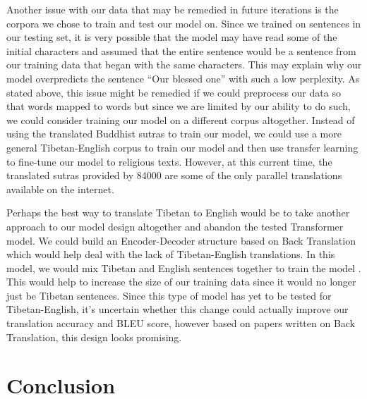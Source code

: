 \documentclass[letterpaper, 12 pt, conference]{ieeeconf}  %
\begin{document}
Another issue with our data that may be remedied in future iterations is the corpora we chose to train and test our model on. Since we trained on sentences in our testing set, it is very possible that the model may have read some of the initial characters and assumed that the entire sentence would be a sentence from our training data that began with the same characters. This may explain why our model overpredicts the sentence “Our blessed one” with such a low perplexity. As stated above, this issue might be remedied if we could preprocess our data so that words mapped to words but since we are limited by our ability to do such, we could consider training our model on a different corpus altogether. Instead of using the translated Buddhist sutras to train our model, we could use a more general Tibetan-English corpus to train our model and then use transfer learning to fine-tune our model to religious texts. However, at this current time, the translated sutras provided by 84000 \cite{c8} are some of the only parallel translations available on the internet. 

Perhaps the best way to translate Tibetan to English would be to take another approach to our model design altogether and abandon the tested Transformer model. We could build an Encoder-Decoder structure based on Back Translation which would help deal with the lack of Tibetan-English translations. In this model, we would mix Tibetan and English sentences together to train the model \cite{c10}. This would help to increase the size of our training data since it would no longer just be Tibetan sentences. Since this type of model has yet to be tested for Tibetan-English, it's uncertain whether this change could actually improve our translation accuracy and BLEU score, however based on papers written on Back Translation, this design looks promising.


\section{Conclusion}
\end{document}
